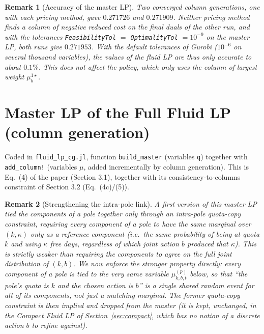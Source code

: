 \documentclass[11pt]{article}
\newtheorem{remark}{Remark}
\begin{document}
\begin{remark}[Accuracy of the master LP]
Two converged column generations, one with each pricing method, gave $0.271726$ and $0.271909$.
Neither pricing method finds a column of negative reduced cost on the final duals of the other run,
and with the tolerances \texttt{FeasibilityTol} $=$ \texttt{OptimalityTol} $= 10^{-9}$ on the master
LP, both runs give $0.271953$. With the default tolerances of Gurobi ($10^{-6}$ on several thousand
variables), the values of the fluid LP are thus only accurate to about $0.1\%$. This does not affect
the policy, which only uses the column of largest weight $\mu^{1\star}_b$.
\end{remark}

\section{Master LP of the Full Fluid LP (column generation)}
\label{sec:master}

Coded in \texttt{fluid\_lp\_cg.jl}, function \texttt{build\_master} (variables
\texttt{q}) together with \texttt{add\_column!} (variables $\mu$, added incrementally by
column generation). This is Eq.~(4) of the paper (Section 3.1), together with its
consistency-to-columns constraint of Section 3.2 (Eq.~(4c)/(5)).

\begin{remark}[Strengthening the intra-pole link]
\label{rem:strengthen}
A first version of this master LP tied the components of a pole together only through an
\emph{intra-pole quota-copy} constraint, requiring every component of a pole to have the
same marginal \emph{over $(k,\kappa)$ only} as a reference component (i.e.\ the same
probability of being at quota $k$ and using $\kappa$ free days, regardless of which joint
action $b$ produced that $\kappa$). This is strictly weaker than requiring the components
to agree on the full joint distribution of $(k,b)$. We now enforce the stronger property
directly: every component of a pole is tied to the very \emph{same} variable
$\mu^{(p)}_{k,b,t}$ below, so that ``the pole's quota is $k$ and the chosen action is $b$''
is a single shared random event for all of its components, not just a matching marginal.
The former quota-copy constraint is then implied and dropped from the master (it is kept,
unchanged, in the Compact Fluid LP of Section~\ref{sec:compact}, which has no notion of a
discrete action $b$ to refine against).
\end{remark}
\end{document}
